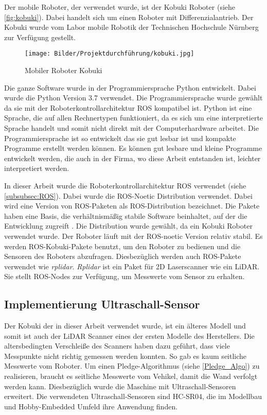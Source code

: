 Der mobile Roboter, der verwendet wurde, ist der Kobuki Roboter (siehe \autoref{fig:kobuki}). Dabei handelt sich um einen Roboter mit Differenzialantrieb. Der Kobuki wurde vom Labor mobile Robotik der Technischen Hochschule Nürnberg zur Verfügung gestellt. 

\begin{figure}[H]
 \centering
 \texttt{[image: Bilder/Projektdurchführung/kobuki.jpg]}
 \caption{Mobiler Roboter Kobuki}
 \label{fig:kobuki}
\end{figure}

Die ganze Software wurde in der Programmiersprache Python entwickelt. Dabei wurde die Python Version 3.7 verwendet. Die Programmiersprache wurde gewählt da sie mit der Roboterkontrollarchitektur ROS kompatibel ist. Python ist eine Sprache, die auf allen Rechnertypen funktioniert, da es sich um eine interpretierte Sprache handelt und somit nicht direkt mit der Computerhardware arbeitet. Die Programmiersprache ist so entwickelt das sie gut lesbar ist und kompakte Programme erstellt werden können.\cite[S. 12 ff]{PythonKompendium.2021} Es können gut lesbare und kleine Programme entwickelt werden, die auch in der Firma, wo diese Arbeit entstanden ist, leichter interpretiert werden.  

In dieser Arbeit wurde die Roboterkontrollarchitektur ROS verwendet (siehe \autoref{subsubsec:ROS}). Dabei wurde die ROS-Noetic Distribution verwendet. Dabei wird eine Version von ROS-Paketen als ROS-Distribution bezeichnet. Die Pakete haben eine Basis, die verhältnismäßig stabile Software beinhaltet, auf der die Entwicklung zugreift \cite{ROS_Distributions.2021}. Die Distribution wurde gewählt, da ein Kobuki Roboter verwendet wurde. Der Roboter läuft mit der ROS-noetic Version relativ stabil. Es werden ROS-Kobuki-Pakete benutzt, um den Roboter zu bedienen und die Sensoren des Roboters abzufragen. Diesbezüglich werden auch ROS-Pakete verwendet wie \textit{rplidar}. \textit{Rplidar} ist ein Paket für 2D Laserscanner wie ein LiDAR. Sie stellt ROS-Nodes zur Verfügung, um Messwerte vom Sensor zu erhalten.  

\subsection{Implementierung Ultraschall-Sensor}

Der Kobuki der in dieser Arbeit verwendet wurde, ist ein älteres Modell und somit ist auch der LiDAR Scanner eines der ersten Modelle des Herstellers. Die altersbedingten Verschleiße des Scanners haben dazu geführt, dass viele Messpunkte nicht richtig gemessen werden konnten. So gab es kaum seitliche Messwerte vom Roboter. Um einen Pledge-Algorithmus (siehe \autoref{Pledge_Algo}) zu realisieren, braucht es seitliche Messwerte vom Vehikel, damit die Wand verfolgt werden kann. Diesbezüglich wurde die Maschine mit Ultraschall-Sensoren erweitert. Die verwendeten Ultraschall-Sensoren sind HC-SR04, die im Modellbau und Hobby-Embedded Umfeld ihre Anwendung finden.  

